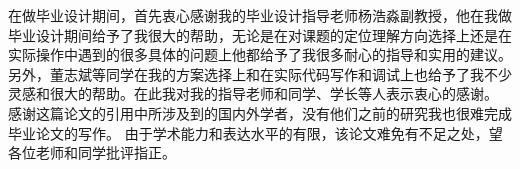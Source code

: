在做毕业设计期间，首先衷心感谢我的毕业设计指导老师杨浩淼副教授，他在我做毕业设计期间给予了我很大的帮助，无论是在对课题的定位理解方向选择上还是在实际操作中遇到的很多具体的问题上他都给予了我很多耐心的指导和实用的建议。另外，董志斌等同学在我的方案选择上和在实际代码写作和调试上也给予了我不少灵感和很大的帮助。在此我对我的指导老师和同学、学长等人表示衷心的感谢。
感谢这篇论文的引用中所涉及到的国内外学者，没有他们之前的研究我也很难完成毕业论文的写作。
由于学术能力和表达水平的有限，该论文难免有不足之处，望各位老师和同学批评指正。
